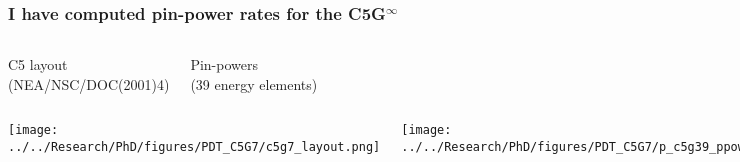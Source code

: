 \documentclass[compress,10pt]{beamer}
\begin{document}
\begin{frame}
    \frametitle{I have computed pin-power rates for the C5G$^\infty$}

    \vspace{-3mm}

    \centering
    \begin{columns}[t]

        \centering

        {\small C5 layout\\ (NEA/NSC/DOC(2001)4)}

        \centering

        {\small Pin-powers\\ (39 energy elements)}

    \end{columns}

    \begin{columns}[t]

        \centering

        \vspace{4.4mm}
         {}\texttt{[image: ../../Research/PhD/figures/PDT\_C5G7/c5g7\_layout.png]} \\

        \centering

        {}\texttt{[image: ../../Research/PhD/figures/PDT\_C5G7/p\_c5g39\_ppowers.png]} \\

    \end{columns}

\end{frame}

\typeout{***********************************************************************************}
\end{document}
